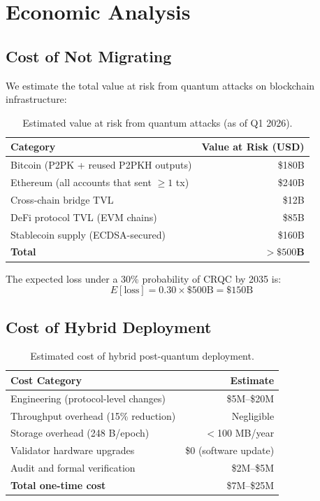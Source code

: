 \section{Economic Analysis}

\label{sec:economics}

\subsection{Cost of Not Migrating}

We estimate the total value at risk from quantum attacks on blockchain infrastructure:

\begin{table}[ht]
\centering
\caption{Estimated value at risk from quantum attacks (as of Q1 2026).}
\label{tab:value-at-risk}
\begin{tabular}{lr}
\toprule
\textbf{Category} & \textbf{Value at Risk (USD)} \\
\midrule
Bitcoin (P2PK + reused P2PKH outputs) & \$180B \\
Ethereum (all accounts that sent $\geq 1$ tx) & \$240B \\
Cross-chain bridge TVL & \$12B \\
DeFi protocol TVL (EVM chains) & \$85B \\
Stablecoin supply (ECDSA-secured) & \$160B \\
\midrule
\textbf{Total} & $>\$500$\textbf{B} \\
\bottomrule
\end{tabular}
\end{table}

The expected loss under a 30\% probability of CRQC by 2035 is:
\[
  E[\text{loss}] = 0.30 \times \$500\text{B} = \$150\text{B}
\]

\subsection{Cost of Hybrid Deployment}

\begin{table}[ht]
\centering
\caption{Estimated cost of hybrid post-quantum deployment.}
\label{tab:migration-cost}
\begin{tabular}{lr}
\toprule
\textbf{Cost Category} & \textbf{Estimate} \\
\midrule
Engineering (protocol-level changes) & \$5M--\$20M \\
Throughput overhead (15\% reduction) & Negligible \\
Storage overhead (248 B/epoch) & $<$100 MB/year \\
Validator hardware upgrades & \$0 (software update) \\
Audit and formal verification & \$2M--\$5M \\
\midrule
\textbf{Total one-time cost} & \$7M--\$25M \\
\bottomrule
\end{tabular}
\end{table}

